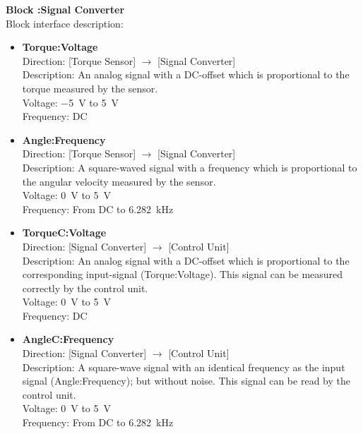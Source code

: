 \textbf{Block :Signal Converter}\\
Block interface description:
\begin{itemize}
	\item \textbf{Torque:Voltage}\\
	Direction: [Torque Sensor] $\rightarrow$ [Signal Converter]\\
	Description: An analog signal with a DC-offset which is proportional to the torque measured by the sensor.\\
	Voltage: \SI{-5}{\volt} to \SI{5}{\volt}\\
	Frequency: DC
	\item \textbf{Angle:Frequency}\\
	Direction: [Torque Sensor] $\rightarrow$ [Signal Converter]\\
	Description: A square-waved signal with a frequency which is proportional to the angular velocity measured by the sensor.\\
	Voltage: \SI{0}{\volt} to \SI{5}{\volt}\\
	Frequency: From DC to \SI{6.282}{\kilo \hertz}
	\item \textbf{TorqueC:Voltage}\\
	Direction: [Signal Converter] $\rightarrow$ [Control Unit]\\
	Description: An analog signal with a DC-offset which is proportional to the corresponding input-signal (Torque:Voltage). This signal can be measured correctly by the control unit.\\
	Voltage: \SI{0}{\volt} to \SI{5}{\volt}\\
	Frequency: DC
	\item \textbf{AngleC:Frequency}\\
	Direction: [Signal Converter] $\rightarrow$ [Control Unit]\\
	Description: A square-wave signal with an identical frequency as the input signal (Angle:Frequency); but without noise. This signal can be read by the control unit.\\
	Voltage: \SI{0}{\volt} to \SI{5}{\volt}\\
	Frequency: From DC to \SI{6.282}{\kilo \hertz}
\end{itemize}

